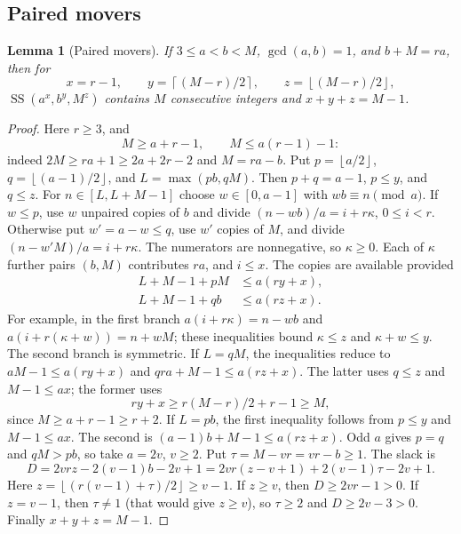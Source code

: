 \documentclass[11pt,a4paper,reqno]{amsart}
\newtheorem{lemma}[theorem]{Lemma}
\theoremstyle{definition}
\theoremstyle{remark}
\newcommand{\ssum}{\operatorname{SS}}
\newcommand{\ceil}[1]{\left\lceil #1\right\rceil}
\newcommand{\floor}[1]{\left\lfloor #1\right\rfloor}
\begin{document}
\subsection{Paired movers}
\begin{lemma}[Paired movers]\label{lem:movers}
If $3\le a<b<M$, $\gcd(a,b)=1$, and $b+M=ra$, then for
\[
 x=r-1,\qquad y=\ceil{(M-r)/2},\qquad z=\floor{(M-r)/2},
\]
$\ssum(a^x,b^y,M^z)$ contains $M$ consecutive integers and $x+y+z=M-1$.
\end{lemma}
\begin{proof}
Here $r\ge3$, and
\begin{equation}\label{eq:mover-bounds}
 M\ge a+r-1,\qquad M\le a(r-1)-1:
\end{equation}
indeed $2M\ge ra+1\ge2a+2r-2$ and $M=ra-b$.
Put $p=\floor{a/2}$, $q=\floor{(a-1)/2}$, and $L=\max(pb,qM)$.
Then $p+q=a-1$, $p\le y$, and $q\le z$.
For $n\in[L,L+M-1]$ choose $w\in[0,a-1]$ with $wb\equiv n\pmod a$.
If $w\le p$, use $w$ unpaired copies of $b$ and divide
$(n-wb)/a=i+r\kappa$, $0\le i<r$. Otherwise put $w'=a-w\le q$,
use $w'$ copies of $M$, and divide $(n-w'M)/a=i+r\kappa$.
The numerators are nonnegative, so $\kappa\ge0$. Each of $\kappa$ further
pairs $(b,M)$ contributes $ra$, and $i\le x$.
The copies are available provided
\begin{align}
 L+M-1+pM&\le a(ry+x),\label{eq:mover-y}\\
 L+M-1+qb&\le a(rz+x).\label{eq:mover-z}
\end{align}
For example, in the first branch
$a(i+r\kappa)=n-wb$ and $a(i+r(\kappa+w))=n+wM$;
these inequalities bound $\kappa\le z$ and $\kappa+w\le y$.
The second branch is symmetric.
If $L=qM$, the inequalities reduce to
$aM-1\le a(ry+x)$ and $qra+M-1\le a(rz+x)$.
The latter uses $q\le z$ and $M-1\le ax$; the former uses
\[
 ry+x\ge r(M-r)/2+r-1\ge M,
\]
since $M\ge a+r-1\ge r+2$.
If $L=pb$, the first inequality follows from $p\le y$ and $M-1\le ax$.
The second is $(a-1)b+M-1\le a(rz+x)$. Odd $a$ gives $p=q$ and
$qM>pb$, so take $a=2v$, $v\ge2$. Put $\tau=M-vr=vr-b\ge1$.
The slack is
\[
 D=2vrz-2(v-1)b-2v+1
  =2vr(z-v+1)+2(v-1)\tau-2v+1.
\]
Here $z=\floor{(r(v-1)+\tau)/2}\ge v-1$. If $z\ge v$, then
$D\ge2vr-1>0$. If $z=v-1$, then $\tau\ne1$ (that would give $z\ge v$),
so $\tau\ge2$ and $D\ge2v-3>0$. Finally $x+y+z=M-1$.
\end{proof}
\end{document}
